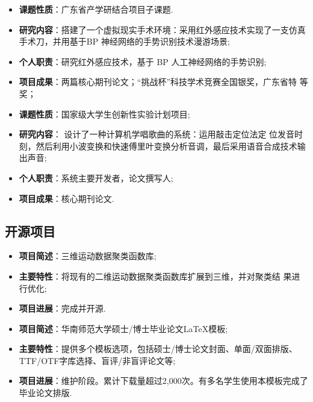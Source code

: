\documentclass[11pt,a4paper,nolmodern]{moderncv}
\begin{document}
%
  {
\begin{itemize}
 \item \textbf{课题性质}：广东省产学研结合项目子课题.
 \item \textbf{研究内容}：搭建了一个虚拟现实手术环境：采用红外感应技术实现了一支仿真手术刀，并用基于BP
   神经网络的手势识别技术漫游场景;
 \item \textbf{个人职责}：研究红外感应技术，基于 BP 人工神经网络的手势识别;
 \item \textbf{项目成果}：两篇核心期刊论文；“挑战杯”科技学术竞赛全国银奖，广东省特
   等奖；
\end{itemize}}

%
  {
\begin{itemize}
\item \textbf{课题性质}：国家级大学生创新性实验计划项目;
\item \textbf{研究内容}： 设计了一种计算机学唱歌曲的系统：运用敲击定位法定
  位发音时刻，然后利用小波变换和快速傅里叶变换分析音调，最后采用语音合成技术输出声音;
\item \textbf{个人职责}：系统主要开发者，论文撰写人;
 \item \textbf{项目成果}：核心期刊论文.
\end{itemize}}

\subsection{\hei 开源项目}

%
  {
\begin{itemize}
\item \textbf{项目简述}：三维运动数据聚类函数库;
\item \textbf{主要特性}：将现有的二维运动数据聚类函数库扩展到三维，并对聚类结
  果进行优化;
\item \textbf{项目进展}：完成并开源.
\end{itemize}}

%
  {
\begin{itemize}
\item \textbf{项目简述}：华南师范大学硕士/博士毕业论文LaTeX模板;
\item \textbf{主要特性}：提供多个模板选项，包括硕士/博士论文封面、单面/双面排版、TTF/OTF字库选择、盲评/非盲评论文等;
\item \textbf{项目进展}：维护阶段。累计下载量超过2,000次。有多名学生使用本模板完成了毕业论文排版.
\end{itemize}}
\end{document}
